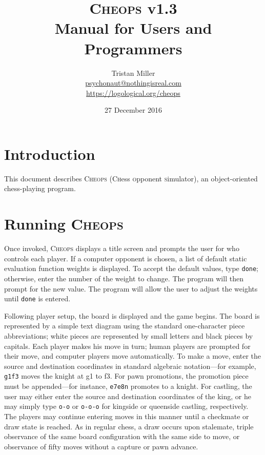 \documentclass[a4paper]{article}
\begin{document}
\title{\textsc{Cheops} v1.3\\Manual for Users and Programmers}
\author{Tristan Miller\\ \url{psychonaut@nothingisreal.com}\\ 
  \url{https://logological.org/cheops}}
\date{27 December 2016}
\maketitle

\section{Introduction}

This document describes \textsc{Cheops} (\textsc{Ch}ess
\textsc{o}pponent \textsc{s}imulator), an object-oriented
chess-playing program.

\section{Running \textsc{Cheops}}

Once invoked, \textsc{Cheops} displays a title screen and prompts the
user for who controls each player. If a computer opponent is chosen, a
list of default static evaluation function weights is displayed.  To
accept the default values, type \texttt{done}; otherwise, enter the
number of the weight to change. The program will then prompt for the
new value.  The program will allow the user to adjust the weights
until \texttt{done} is entered.

Following player setup, the board is displayed and the game begins.
The board is represented by a simple text diagram using the standard
one-character piece abbreviations; white pieces are represented by
small letters and black pieces by capitals.  Each player makes his
move in turn; human players are prompted for their move, and computer
players move automatically. To make a move, enter the source and
destination coordinates in standard algebraic notation---for example,
\texttt{g1f3} moves the knight at g1 to f3.  For pawn promotions, the
promotion piece must be appended---for instance, \texttt{e7e8n}
promotes to a knight. For castling, the user may either enter the
source and destination coordinates of the king, or he may simply type
\texttt{o-o} or \texttt{o-o-o} for kingside or queenside castling,
respectively. The players may continue entering moves in this manner
until a checkmate or draw state is reached. As in regular chess, a
draw occurs upon stalemate, triple observance of the same board
configuration with the same side to move, or observance of fifty moves
without a capture or pawn advance.
\end{document}
